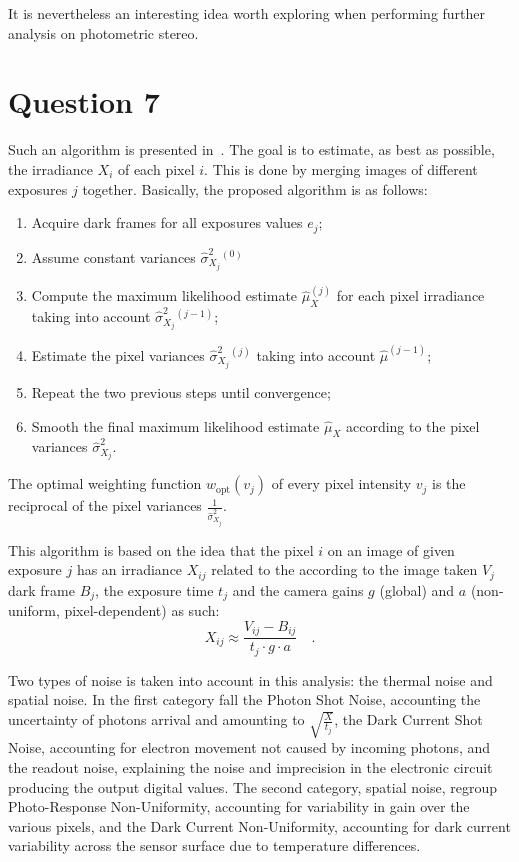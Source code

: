 \documentclass{report}
\begin{document}
It is nevertheless an interesting idea worth exploring when performing further analysis on photometric stereo.

\section{Question 7}

Such an algorithm is presented in~\cite{Granados2010a}. The goal is to estimate, as best as possible, the irradiance $X_i$ of each pixel $i$. This is done by merging images of different exposures $j$ together. Basically, the proposed algorithm is as follows:
\begin{enumerate}
  \item{Acquire dark frames for all exposures values $e_j$;}
  \item{Assume constant variances $\hat{\sigma}_{X_j}^2{}^{(0)}$}
  \item{Compute the maximum likelihood estimate $\hat{\mu}_X^{(j)}$ for each pixel irradiance taking into account $\hat{\sigma}_{X_j}^2{}^{(j-1)}$;}
  \item{Estimate the pixel variances $\hat{\sigma}_{X_j}^2{}^{(j)}$ taking into account $\hat{\mu}^{(j-1)}$;}
  \item{Repeat the two previous steps until convergence;}
  \item{Smooth the final maximum likelihood estimate $\hat{\mu}_X$ according to the pixel variances $\hat{\sigma}_{X_j}^2$}.
\end{enumerate}

The optimal weighting function $w_{\mathrm{opt}}\left(v_j\right)$ of every pixel intensity $v_j$ is the reciprocal of the pixel variances $\frac{1}{\hat{\sigma}_{X_j}^2}$.

This algorithm is based on the idea that the pixel $i$ on an image of given exposure $j$ has an irradiance $X_{ij}$ related to the according to the image taken $V_j$ dark frame $B_j$, the exposure time $t_j$ and the camera gains $g$ (global) and $a$ (non-uniform, pixel-dependent) as such:
\begin{equation}
\label{q7:eqirr}
X_{ij} \approx \frac{V_{ij} - B_{ij}}{t_j \cdot g \cdot a}
\quad.
\end{equation}

Two types of noise is taken into account in this analysis: the thermal noise and spatial noise. In the first category fall the Photon Shot Noise, accounting the uncertainty of photons arrival and amounting to $\sqrt{\frac{X}{t_j}}$, the Dark Current Shot Noise, accounting for electron movement not caused by incoming photons, and the readout noise, explaining the noise and imprecision in the electronic circuit producing the output digital values. The second category, spatial noise, regroup Photo-Response Non-Uniformity, accounting for variability in gain over the various pixels, and the Dark Current Non-Uniformity, accounting for dark current variability across the sensor surface due to temperature differences.
\end{document}
